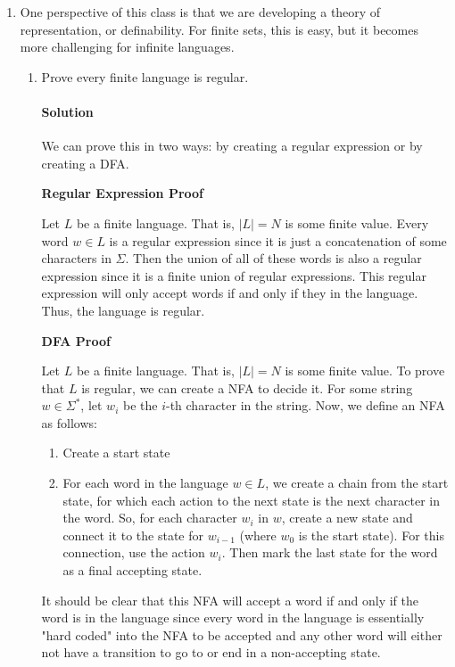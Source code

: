 \documentclass[11pt]{article}
\newcommand{\solution}[1]{\paragraph{Solution}  }
\begin{document}
\begin{enumerate}

    \item 
    
    One perspective of this class is that we are developing a theory of representation, or definability. For finite sets, this is easy, but it becomes more challenging for infinite languages. 

    \begin{enumerate}
        \item Prove every finite language is regular.
            \solution{}
            We can prove this in two ways: by creating a regular expression or by creating a DFA.

            \textbf{Regular Expression Proof}

            Let $L$ be a finite language. That is, $|L| = N$ is some finite value. Every word $w \in L$ is a regular expression since it is just a concatenation of some characters in $\Sigma$. Then the union of all of these words is also a regular expression since it is a finite union of regular expressions. This regular expression will only accept words if and only if they in the language. Thus, the language is regular.

            \textbf{DFA Proof}
            
            Let $L$ be a finite language. That is, $|L| = N$ is some finite value. To prove that $L$ is regular, we can create a NFA to decide it. For some string $w \in \Sigma^*$, let $w_i$ be the $i$-th character in the string. Now, we define an NFA as follows:

            \begin{enumerate}
                \item Create a start state
                \item For each word in the language $w \in L$, we create a chain from the start state, for which each action to the next state is the next character in the word. So, for each character $w_i$ in $w$, create a new state and connect it to the state for $w_{i - 1}$ (where $w_0$ is the start state). For this connection, use the action $w_i$. Then mark the last state for the word as a final accepting state.
            \end{enumerate}

            It should be clear that this NFA will accept a word if and only if the word is in the language since every word in the language is essentially "hard coded" into the NFA to be accepted and any other word will either not have a transition to go to or end in a non-accepting state.


\end{enumerate}
\end{enumerate}
\end{document}
